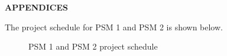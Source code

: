\documentclass[english]{umpthesis}
\begin{document}
    \listofsymbols

    \listofabbreviations

    \listofappendices
    
    \mainmatter



    
    

    \newpage
    \thispagestyle{plain}
    \begin{center}
        \vspace*{\fill}
        {\bfseries APPENDICES}
        \vspace*{\fill}
    \end{center}
    \clearpage

    

    \begin{landscape}
    The project schedule for PSM 1 and PSM 2 is shown below.
    \begin{figure}[htbp]
        \centering
        
        \caption{PSM 1 and PSM 2 project schedule}
        \label{fig:gantt}
    \end{figure}
    \end{landscape}
\end{document}
